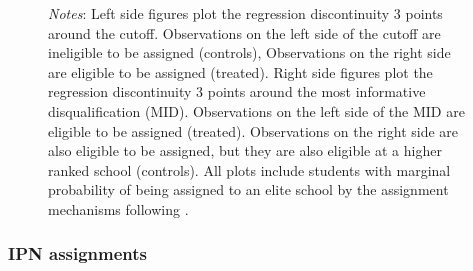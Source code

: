 \documentclass[oneside,11pt]{article}
\begin{document}
\begin{figure}[H]
\footnotesize
\textit{Notes}: Left side figures plot the regression discontinuity 3 points around the cutoff. Observations on the left side of the cutoff are ineligible to be assigned (controls), Observations on the right side are eligible to be assigned (treated). Right side figures plot the regression discontinuity 3 points around the most informative disqualification (MID). Observations on the left side of the MID are eligible to be assigned (treated). Observations on the right side are also eligible to be assigned, but they are also eligible at a higher ranked school (controls). All plots include students with marginal probability of being assigned to an elite school by the assignment mechanisms following \citet{abdulkadirouglu2022breaking}. 
\end{figure}

\subsubsection{IPN assignments}
\end{document}
